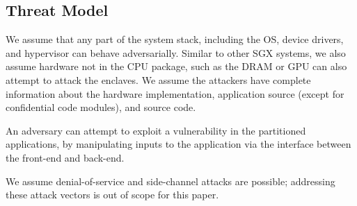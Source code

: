 







\subsection{Threat Model}


We assume that any part of the system stack, including the OS,
device drivers, and hypervisor can behave adversarially.
Similar to other SGX systems, we also assume 
hardware not in the CPU package, such as the DRAM or GPU 
can also attempt to attack the enclaves.
We assume the attackers have complete information
about the \sgx{} hardware implementation, application source (except for confidential code modules), and \sysname{} source code.

An adversary can attempt to
exploit a vulnerability in the partitioned applications,
by manipulating inputs to the application via the interface between the
front-end and back-end.

We assume denial-of-service and side-channel attacks are possible; 
addressing these attack vectors is out of scope for this paper.


